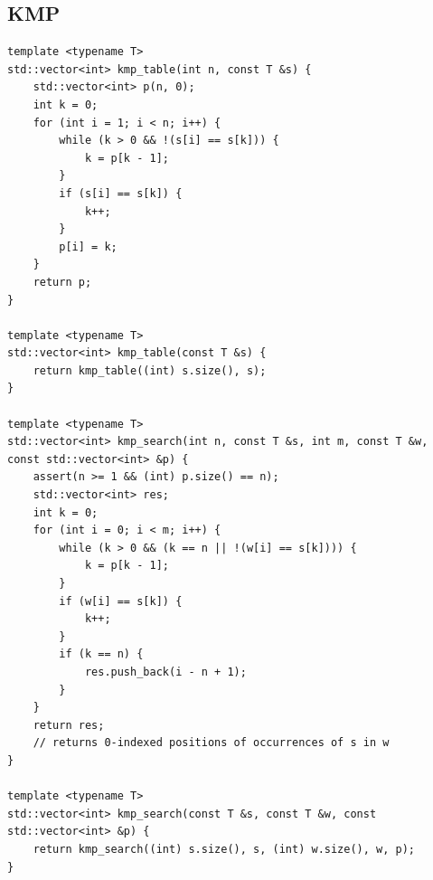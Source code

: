 \documentclass[twoside]{article}
\begin{document}
\subsection{KMP}
\begin{lstlisting}
template <typename T>
std::vector<int> kmp_table(int n, const T &s) {
    std::vector<int> p(n, 0);
    int k = 0;
    for (int i = 1; i < n; i++) {
        while (k > 0 && !(s[i] == s[k])) {
            k = p[k - 1];
        }
        if (s[i] == s[k]) {
            k++;
        }
        p[i] = k;
    }
    return p;
}

template <typename T>
std::vector<int> kmp_table(const T &s) {
    return kmp_table((int) s.size(), s);
}

template <typename T>
std::vector<int> kmp_search(int n, const T &s, int m, const T &w, const std::vector<int> &p) {
    assert(n >= 1 && (int) p.size() == n);
    std::vector<int> res;
    int k = 0;
    for (int i = 0; i < m; i++) {
        while (k > 0 && (k == n || !(w[i] == s[k]))) {
            k = p[k - 1];
        }
        if (w[i] == s[k]) {
            k++;
        }
        if (k == n) {
            res.push_back(i - n + 1);
        }
    }
    return res;
    // returns 0-indexed positions of occurrences of s in w
}

template <typename T>
std::vector<int> kmp_search(const T &s, const T &w, const std::vector<int> &p) {
    return kmp_search((int) s.size(), s, (int) w.size(), w, p);
}
\end{lstlisting}
\end{document}
